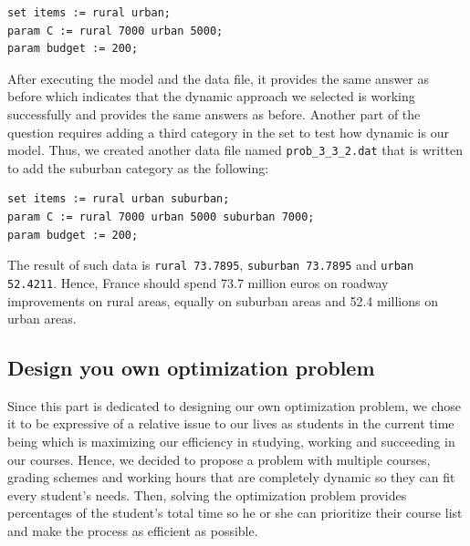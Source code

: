 \begin{verbatim}
set items := rural urban;
param C := rural 7000 urban 5000;
param budget := 200;
\end{verbatim}

After executing the model and the data file, it provides the same answer as before which indicates that the dynamic approach we selected is working successfully and provides the same answers as before. Another part of the question requires adding a third category in the set to test how dynamic is our model. Thus, we created another data file named \texttt{prob\_3\_3\_2.dat} that is written to add the suburban category as the following:

\begin{verbatim}
set items := rural urban suburban;
param C := rural 7000 urban 5000 suburban 7000;
param budget := 200;
\end{verbatim}
The result of such data is \texttt{rural  73.7895}, \texttt{suburban  73.7895} and \texttt{urban  52.4211}. Hence, France should spend 73.7 million euros on roadway improvements on rural areas, equally on suburban areas and 52.4 millions on urban areas.


\subsection{Design you own optimization problem}
Since this part is dedicated to designing our own optimization problem, we chose it to be expressive of a relative issue to our lives as students in the current time being which is maximizing our efficiency in studying, working and succeeding in our courses. Hence, we decided to propose a problem with multiple courses, grading schemes and working hours that are completely dynamic so they can fit every student's needs. Then, solving the optimization problem provides percentages of the student's total time so he or she can prioritize their course list and make the process as efficient as possible. 

